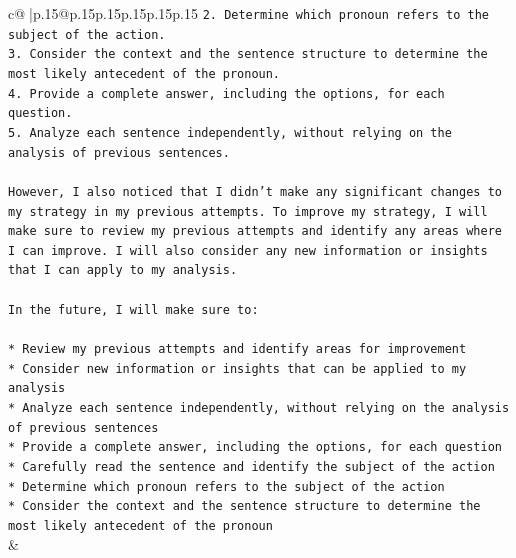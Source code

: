 \documentclass{article}
\begin{document}
{\begin{supertabular}{c@{$\;$}|p{.15\linewidth}@{}p{.15\linewidth}p{.15\linewidth}p{.15\linewidth}p{.15\linewidth}p{.15\linewidth}}
{{{\texttt{2. Determine which pronoun refers to the subject of the action.} \\
\texttt{3. Consider the context and the sentence structure to determine the most likely antecedent of the pronoun.} \\
\texttt{4. Provide a complete answer, including the options, for each question.} \\
\texttt{5. Analyze each sentence independently, without relying on the analysis of previous sentences.} \\
\\ 
\texttt{However, I also noticed that I didn't make any significant changes to my strategy in my previous attempts. To improve my strategy, I will make sure to review my previous attempts and identify any areas where I can improve. I will also consider any new information or insights that I can apply to my analysis.} \\
\\ 
\texttt{In the future, I will make sure to:} \\
\\ 
\texttt{* Review my previous attempts and identify areas for improvement} \\
\texttt{* Consider new information or insights that can be applied to my analysis} \\
\texttt{* Analyze each sentence independently, without relying on the analysis of previous sentences} \\
\texttt{* Provide a complete answer, including the options, for each question} \\
\texttt{* Carefully read the sentence and identify the subject of the action} \\
\texttt{* Determine which pronoun refers to the subject of the action} \\
\texttt{* Consider the context and the sentence structure to determine the most likely antecedent of the pronoun} \\
            }
        }
    }
    & \\ \\

\end{supertabular}
}
\end{document}
